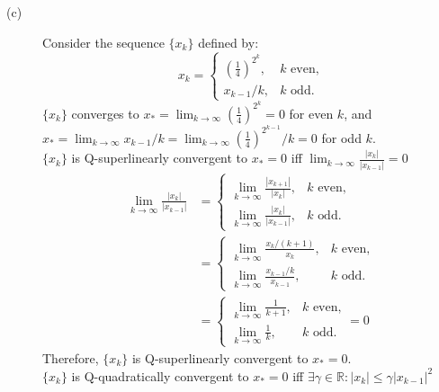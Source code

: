 \documentclass[11pt]{article}
\begin{document}
\begin{description}
\begin{description}
    \item[(c)]
    Consider the sequence $\{x_k\}$ defined by:
    \begin{equation*}
        x_k = \begin{cases}
            (\frac{1}{4})^{2^k}, & k\text{ even,}\\
            x_{k-1}/k, & k\text{ odd.}
        \end{cases}
    \end{equation*}
    $\{x_k\}$ converges to $x_*=\lim_{k\rightarrow\infty}(\frac{1}{4})^{2^k}=0$ for even $k$, and
    $x_*=\lim_{k\rightarrow\infty}x_{k-1}/k=\lim_{k\rightarrow\infty}(\frac{1}{4})^{2^{k-1}}/k=0$ for odd $k$. \\
    $\{x_k\}$ is Q-superlinearly convergent to $x_*=0$
    iff $\lim_{k\rightarrow\infty}\frac{|x_k|}{|x_{k-1}|}=0$
    \begin{equation*}
        \begin{aligned}
            \lim_{k\rightarrow\infty}\frac{|x_k|}{|x_{k-1}|} &= \begin{cases}
                \lim_{k\rightarrow\infty}\frac{|x_{k+1}|}{|x_k|}, & k\text{ even,}\\
                \lim_{k\rightarrow\infty}\frac{|x_k|}{|x_{k-1}|}, & k\text{ odd.}
            \end{cases} \\
            &= \begin{cases}
                \lim_{k\rightarrow\infty}\frac{x_k/(k+1)}{x_k}, & k\text{ even,}\\
                \lim_{k\rightarrow\infty}\frac{x_{k-1}/k}{x_{k-1}}, & k\text{ odd.}
            \end{cases} \\
            &= \begin{cases}
                \lim_{k\rightarrow\infty}\frac{1}{k+1}, & k\text{ even,}\\
                \lim_{k\rightarrow\infty}\frac{1}{k}, & k\text{ odd.}
            \end{cases}
            = 0
        \end{aligned}
    \end{equation*}
    Therefore, $\{x_k\}$ is Q-superlinearly convergent to $x_*=0$. \\
    $\{x_k\}$ is Q-quadratically convergent to $x_*=0$
    iff $\exists\gamma\in\mathbb{R}: |x_k| \leq \gamma|x_{k-1}|^2$
    \begin{equation*}
        \begin{aligned}

\end{aligned}
\end{equation*}
\end{description}
\end{description}
\end{document}
